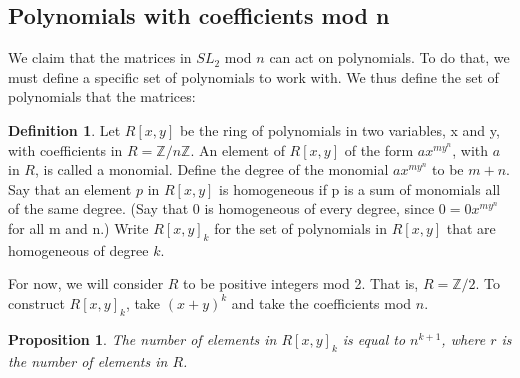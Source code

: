 \documentclass[a4paper,draft]{amsproc}
\theoremstyle{plain}
\newtheorem{prop}{Proposition}[section]
\theoremstyle{definition}
\newtheorem{dfn}{Definition}[section]
\theoremstyle{remark}
\numberwithin{equation}{section}
\begin{document}
\subsection{Polynomials with coefficients mod n}
We claim that the matrices in $SL_{2}$ mod $n$ can act on polynomials. To do that, we must define a specific set of polynomials to work with. 
We thus define the set of polynomials that the matrices: 
\begin{dfn}
Let $R[x,y]$ be the ring of polynomials in two variables, x and y, with coefficients in $R = \mathbb{Z}/n\mathbb{Z}$. An element of $R[x,y]$ of the form  $ax^{my^{n}}$, with $a$ in $R$, is called a monomial. Define the degree of the monomial $ax^{my^{n}}$ to be $m+n$. Say that an element $p$ in $R[x,y]$ is homogeneous if p is a sum of monomials all of the same degree. (Say that 0 is homogeneous of every degree, since $0=0x^{my^{n}}$ for all m and n.) Write $R[x,y]_{k}$ for the set of polynomials in $R[x,y]$ that are homogeneous of degree $k$.
\end{dfn}
For now, we will consider $R$ to be positive integers mod 2. That is, $R = \mathbb{Z}/2$. To construct $R[x,y]_{k}$, take $(x+y)^{k}$ and take the coefficients mod $n$.

\begin{prop}The number of elements in $R[x,y]_{k}$ is equal to $n^{k + 1}$, where $r$ is the number of elements in $R$. 
\end{prop}
\end{document}
